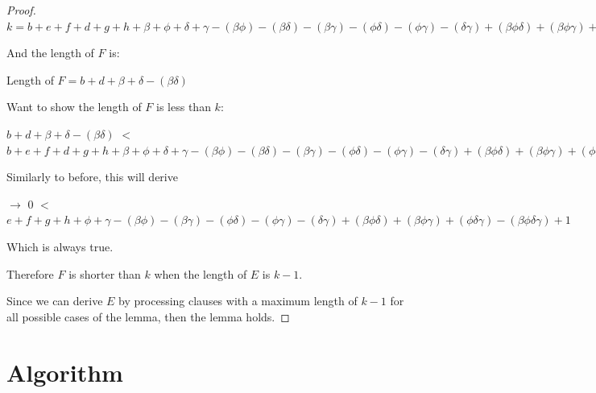 \documentclass[manuscript]{acmart}
\begin{document}
\begin{proof}
        $k = b + e + f + d + g + h 
            + \beta + \phi + \delta + \gamma
            - (\beta \phi) - (\beta \delta) - (\beta \gamma) - (\phi \delta) - (\phi \gamma) - (\delta \gamma)
            + (\beta \phi \delta) + (\beta \phi \gamma) + (\phi \delta \gamma)
            - (\beta \phi \delta \gamma)
            + 1
            $

        And the length of $F$ is:

        Length of $F = b + d + \beta + \delta - (\beta \delta)$

        Want to show the length of $F$ is less than $k$:

        $b + d + \beta + \delta - (\beta \delta)$
        $<$
        $b + e + f + d + g + h 
            + \beta + \phi + \delta + \gamma
            - (\beta \phi) - (\beta \delta) - (\beta \gamma) - (\phi \delta) - (\phi \gamma) - (\delta \gamma)
            + (\beta \phi \delta) + (\beta \phi \gamma) + (\phi \delta \gamma)
            - (\beta \phi \delta \gamma)
            + 1
        $

        Similarly to before, this will derive

        $\rightarrow$
        $0$
        $<$
        $e + f + g + h 
            + \phi + \gamma
            - (\beta \phi) - (\beta \gamma) - (\phi \delta) - (\phi \gamma) - (\delta \gamma)
            + (\beta \phi \delta) + (\beta \phi \gamma) + (\phi \delta \gamma)
            - (\beta \phi \delta \gamma)
            + 1
        $

        Which is always true.

        Therefore $F$ is shorter than $k$ when the length of $E$ is $k - 1$.

        Since we can derive $E$ by processing clauses with a maximum length of $k - 1$ for all possible cases of the lemma, then the lemma holds.
    \end{proof}

    \section{Algorithm}
\end{document}
